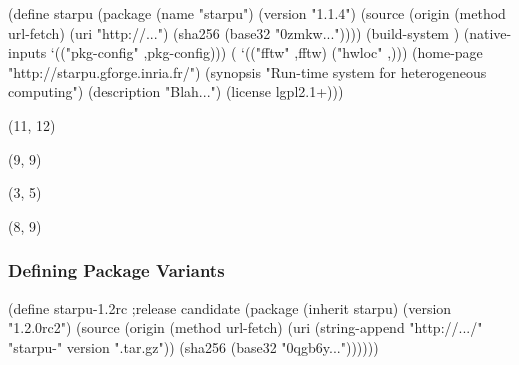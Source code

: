 \documentclass{beamer}
\begin{document}
\begin{frame}[fragile]
  \begin{semiverbatim}
\small{
(define starpu
  (\alert{package}
    (name "starpu")
    (version "1.1.4")
    (source (origin
             (method url-fetch)
             (uri "http://\textrm{...}")
             (sha256 (base32 "0zmkw\textrm{...}"))))
    (\alert{build-system} )
    (native-inputs `(("pkg-config" ,pkg-config)))
    ( `(("fftw" ,fftw)
              ("hwloc" ,)))
    (home-page "http://starpu.gforge.inria.fr/")
    (synopsis "Run-time system for heterogeneous computing")
    (description "Blah...")
    (license lgpl2.1+)))
}
  \end{semiverbatim}

  \begin{textblock}{5}(11, 12)
  \end{textblock}

  \begin{textblock}{5}(9, 9)
  \end{textblock}

  \begin{textblock}{5}(3, 5)
  \end{textblock}

  \begin{textblock}{5}(8, 9)
  \end{textblock}

\end{frame}

\begin{frame}[fragile]
  \frametitle{Defining Package Variants}

  \begin{semiverbatim}
\small{
(define starpu-1.2rc              ;release candidate
  (package (\alert{inherit} starpu)
    (version "1.2.0rc2")
    (source (origin
             (method url-fetch)
             (uri (string-append "http://\textrm{...}/"
                                 "starpu-" version ".tar.gz"))
             (sha256 (base32 "0qgb6y\textrm{...}"))))))
}
  \end{semiverbatim}
\end{frame}
\end{document}
